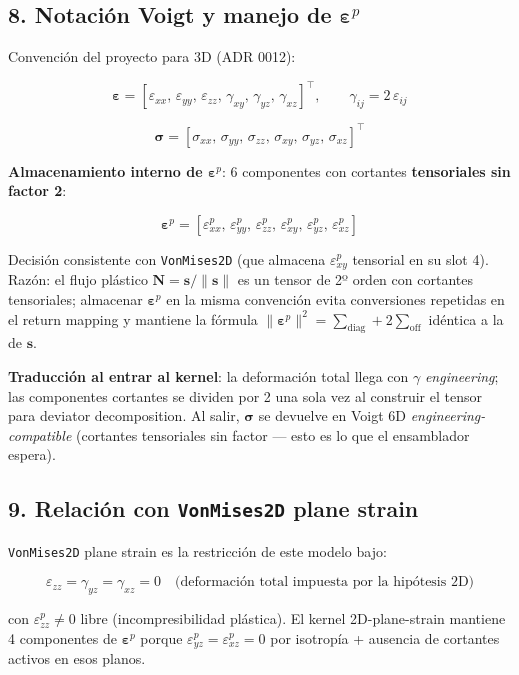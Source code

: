 \documentclass[11pt,letterpaper,oneside]{report}
\begin{document}
\subsection{8. Notación Voigt y manejo de $\boldsymbol\varepsilon^p$}

Convención del proyecto para 3D (ADR 0012):

\[
\boldsymbol\varepsilon = [\varepsilon_{xx},\,\varepsilon_{yy},\,\varepsilon_{zz},\,\gamma_{xy},\,\gamma_{yz},\,\gamma_{xz}]^\top, \qquad \gamma_{ij} = 2\,\varepsilon_{ij}
\]

\[
\boldsymbol\sigma = [\sigma_{xx},\,\sigma_{yy},\,\sigma_{zz},\,\sigma_{xy},\,\sigma_{yz},\,\sigma_{xz}]^\top
\]

\textbf{Almacenamiento interno de $\boldsymbol\varepsilon^p$}: 6 componentes con cortantes \textbf{tensoriales sin factor 2}:

\[
\boldsymbol\varepsilon^p = [\varepsilon^p_{xx},\,\varepsilon^p_{yy},\,\varepsilon^p_{zz},\,\varepsilon^p_{xy},\,\varepsilon^p_{yz},\,\varepsilon^p_{xz}]
\]

Decisión consistente con \texttt{VonMises2D} (que almacena $\varepsilon^p_{xy}$ tensorial en su slot 4). Razón: el flujo plástico $\mathbf N = \mathbf s/\|\mathbf s\|$ es un tensor de 2º orden con cortantes tensoriales; almacenar $\boldsymbol\varepsilon^p$ en la misma convención evita conversiones repetidas en el return mapping y mantiene la fórmula $\|\boldsymbol\varepsilon^p\|^2 = \sum_\text{diag} + 2\sum_\text{off}$ idéntica a la de $\mathbf s$.

\textbf{Traducción al entrar al kernel}: la deformación total llega con $\gamma$ \textit{engineering}; las componentes cortantes se dividen por 2 una sola vez al construir el tensor para deviator decomposition. Al salir, $\boldsymbol\sigma$ se devuelve en Voigt 6D \textit{engineering-compatible} (cortantes tensoriales sin factor --- esto es lo que el ensamblador espera).

\subsection{9. Relación con \texttt{VonMises2D} plane strain}

\texttt{VonMises2D} plane strain es la restricción de este modelo bajo:

\[
\varepsilon_{zz} = \gamma_{yz} = \gamma_{xz} = 0 \quad\text{(deformación total impuesta por la hipótesis 2D)}
\]

con $\varepsilon^p_{zz} \neq 0$ libre (incompresibilidad plástica). El kernel 2D-plane-strain mantiene 4 componentes de $\boldsymbol\varepsilon^p$ porque $\varepsilon^p_{yz} = \varepsilon^p_{xz} = 0$ por isotropía + ausencia de cortantes activos en esos planos.
\end{document}
